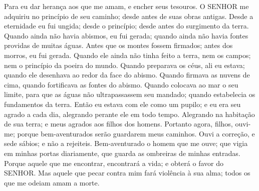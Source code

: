 {  Para eu dar herança aos que me amam, e encher seus tesouros.
  O SENHOR me adquiriu no princípio de seu caminho; desde antes de suas obras antigas.
  Desde a eternidade eu fui ungida; desde o princípio; desde antes do surgimento da terra.
  Quando ainda não havia abismos, eu fui gerada; quando ainda não havia fontes providas de muitas águas.
  Antes que os montes fossem firmados; antes dos morros, eu fui gerada.
  Quando ele ainda não tinha feito a terra, nem os campos; nem o princípio da poeira do mundo.
  Quando preparava os céus, ali eu estava; quando ele desenhava ao redor da face do abismo.
  Quando firmava as nuvens de cima, quando fortificava as fontes do abismo.
  Quando colocava ao mar o seu limite, para que as águas não ultrapassassem seu mandado; quando estabelecia os fundamentos da terra.
  Então eu estava com ele como um pupilo; e eu era seu agrado a cada dia, alegrando perante ele em todo tempo.
  Alegrando na habitação de sua terra; e
{} meus agrados aos filhos dos homens.
  Portanto agora, filhos, ouvi-me; porque bem-aventurados serão
{} guardarem meus caminhos.
  Ouvi a correção, e sede sábios; e não a rejeiteis.
  Bem-aventurado
{} o homem que me ouve; que vigia em minhas portas diariamente, que guarda as ombreiras de minhas entradas.
  Porque aquele que me encontrar, encontrará a vida; e obterá o favor do SENHOR.
  Mas aquele que pecar contra mim fará violência à sua
{} alma; todos os que me odeiam amam a morte.
\par }

